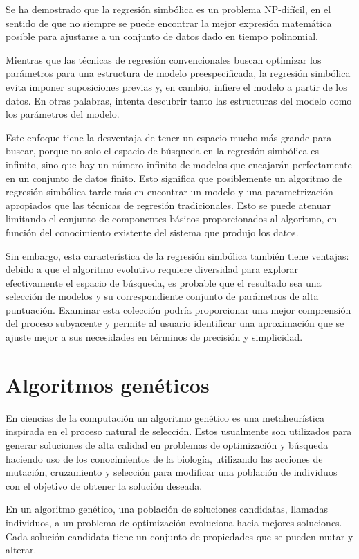 Se ha demostrado que la regresión simbólica es un problema NP-difícil, en el sentido de que no siempre se puede encontrar la mejor expresión matemática posible para ajustarse a un conjunto de datos dado en tiempo polinomial.

Mientras que las técnicas de regresión convencionales buscan optimizar los parámetros para una estructura de modelo preespecificada, la regresión simbólica evita imponer suposiciones previas y, en cambio, infiere el modelo a partir de los datos. En otras palabras, intenta descubrir tanto las estructuras del modelo como los parámetros del modelo.

Este enfoque tiene la desventaja de tener un espacio mucho más grande para buscar, porque no solo el espacio de búsqueda en la regresión simbólica es infinito, sino que hay un número infinito de modelos que encajarán perfectamente en un conjunto de datos finito. Esto significa que posiblemente un algoritmo de regresión simbólica tarde más en encontrar un modelo y una parametrización apropiados que las técnicas de regresión tradicionales. Esto se puede atenuar limitando el conjunto de componentes básicos proporcionados al algoritmo, en función del conocimiento existente del sistema que produjo los datos.

Sin embargo, esta característica de la regresión simbólica también tiene ventajas: debido a que el algoritmo evolutivo requiere diversidad para explorar efectivamente el espacio de búsqueda, es probable que el resultado sea una selección de modelos y su correspondiente conjunto de parámetros de alta puntuación. Examinar esta colección podría proporcionar una mejor comprensión del proceso subyacente y permite al usuario identificar una aproximación que se ajuste mejor a sus necesidades en términos de precisión y simplicidad.

\section{Algoritmos genéticos}

En ciencias de la computación un algoritmo genético es una metaheurística inspirada en el proceso natural de selección. Estos usualmente son utilizados para generar soluciones de alta calidad en problemas de optimización y búsqueda haciendo uso de los conocimientos de la biología, utilizando las acciones de mutación, cruzamiento y selección para modificar una población de individuos con el objetivo de obtener la solución deseada.

En un algoritmo genético, una población de soluciones candidatas, llamadas individuos, a un problema de optimización evoluciona hacia mejores soluciones. Cada solución candidata tiene un conjunto de propiedades que se pueden mutar y alterar.

